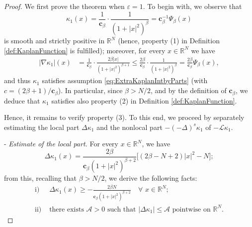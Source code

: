 \documentclass[11pt,a4paper,reqno]{amsart}
\def \R {\mathbb{R}}
\def \e {\varepsilon}
\def \LL {\mathcal{L}}
\theoremstyle{definition}
\theoremstyle{plain}
\numberwithin{equation}{section}
\begin{document}
\begin{proof}
	We first prove the theorem when $\e = 1$. To begin with, we observe that
	$$\kappa_1(x) = \frac{1}{\mathbf{c}_\beta}\cdot\frac{1}{(1+|x|^2)^\beta} = \mathbf{c}_\beta^{-1}\Psi_\beta(x)$$
	is  smooth and strictly positive in $\mathbb{R}^N$ (hence,
	property (1) in Definition \ref{def:KaplanFunction} is fulfilled); more\-over, for every $x\in\mathbb{R}^N$ we have
	\begin{align*}
	|\nabla\kappa_1|(x) & = \frac{1}{\mathbf{c}_\beta}
	\cdot\frac{2\beta|x|}{(1+|x|^2)^{\beta+1}}
	\leq \frac{2\beta}{\mathbf{c}_\beta}\cdot\frac{1}{(1+|x|^2)^\beta} =
	\frac{2\beta}{\mathbf{c}_\beta}\Psi_\beta(x),
	\end{align*}
and thus $\kappa_1$ satisfies assumption \eqref{eq:ExtraKaplanIntbyParts} (with
$c = (2\beta+1)/\mathbf{c}_\beta$). In particular, since $\beta > N/2$, and by
the  definition of $\mathbf{c}_\beta$, we deduce that $\kappa_1$ satisfies also
property (2)
in Definition \ref{def:KaplanFunction}.

Hence, it remains to verify
 property (3).
To this end, we proceed by separately estimating the local part $\Delta\kappa_1$ and the nonlocal part $-(-\Delta)^s\kappa_1$ of $-\LL\kappa_1$.
\medskip

\noindent -\,\,\emph{Estimate of the local part.} For every $x\in\mathbb{R}^N$, we have
$$\Delta\kappa_1(x) = \frac{2\beta}{\mathbf{c}_\beta(1+|x|^2)^{\beta+2}}\big[(2\beta-N+2)|x|^2-N\big];$$
from this, recalling that $\beta > N/2$, we derive the following facts:
\begin{align}
\mathrm{i)}\,\,& \Delta\kappa_1(x)\geq -\frac{2\beta N}{\mathbf{c}_\beta(1+|x|^2)^{\beta+2}}\quad\forall\,\,x\in\mathbb{R}^N; \label{eq:Deltakappageq}\\[0.1cm]
 \mathrm{ii)}\,\,&\text{there exists $\mathcal{A} > 0$ such that $|\Delta\kappa_1|\leq \mathcal{A}$ pointwise on $\R^N$}.	\label{eq:DeltakappaBd}
\end{align}


\end{proof}
\end{document}
